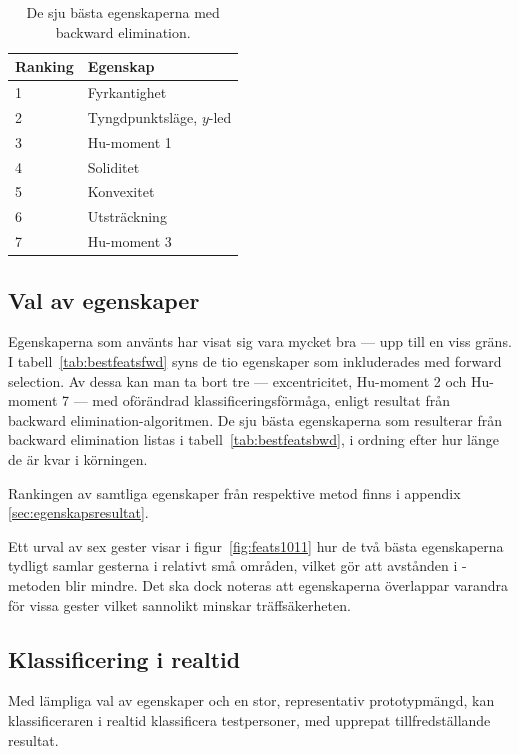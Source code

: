 \documentclass[../rapport_MVEX01-11-05]{subfiles}
\begin{document}
\begin{table}[tb]
	\centering
    \caption{De sju bästa egenskaperna med backward elimination.}
	
	\label{tab:bestfeatsbwd}
	\begin{tabular}{ll}
		\toprule
		Ranking & Egenskap \\
		\midrule
                1 & Fyrkantighet \\
                2 & Tyngdpunktsläge, $y$-led \\
                3 & Hu-moment 1\\
                4 & Soliditet\\
                5 & Konvexitet \\
                6 & Utsträckning \\
                7 & Hu-moment 3 \\
		\bottomrule
	\end{tabular}
\end{table}

\subsection{Val av egenskaper}\label{sec:resultat_features}
Egenskaperna som använts har visat sig vara mycket bra --- upp till en viss gräns.
I tabell~\vref{tab:bestfeatsfwd} syns de tio egenskaper som inkluderades
med forward selection. Av dessa kan man ta bort tre --- excentricitet,
Hu-moment 2 och Hu-moment 7 ---
med oförändrad klassificeringsförmåga, enligt resultat från backward
elimination-algoritmen. De sju bästa egenskaperna som resulterar från
backward elimination listas i tabell~\vref{tab:bestfeatsbwd}, i
ordning efter hur länge de är kvar i körningen.

Rankingen av samtliga egenskaper från respektive metod finns i appendix
\ref{sec:egenskapsresultat}.

Ett urval av sex gester visar i
figur~\vref{fig:feats1011} hur de två bästa egenskaperna tydligt samlar 
gesterna i relativt små områden, vilket gör att avstånden i \knn-metoden 
blir mindre. Det ska dock noteras att egenskaperna 
överlappar varandra för vissa gester vilket sannolikt minskar träffsäkerheten.

\subsection{Klassificering i realtid}
Med lämpliga val av egenskaper och en stor, representativ prototypmängd,
kan klassificeraren i realtid klassificera testpersoner, med upprepat
tillfredställande resultat.
\end{document}
